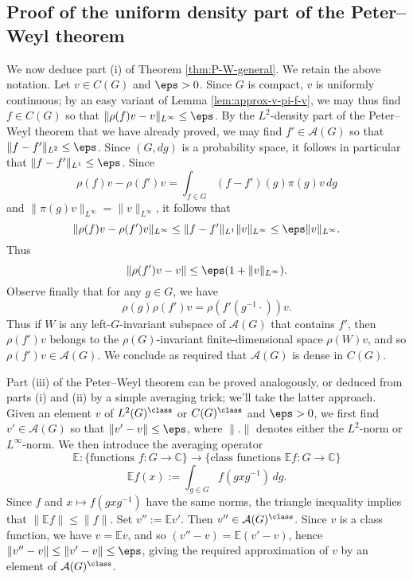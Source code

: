 \documentclass[reqno]{amsart} 
\begin{document}
\subsection{Proof of the uniform density
part of the Peter--Weyl theorem}
We now deduce part (i) of Theorem \ref{thm:P-W-general}.  We retain the above notation.  Let $v \in C(G)$ and $\eps > 0$.  Since $G$ is compact, $v$ is uniformly continuous; by an easy variant of Lemma \ref{lem:approx-v-pi-f-v}, we may thus find $f \in C(G)$ so that $\|\rho(f) v - v\|_{L^\infty} \leq \eps$.  By the $L^2$-density part of the Peter--Weyl theorem that we have already proved, we may find $f' \in \mathcal{A}(G)$ so that $\|f - f'\|_{L^2} \leq \eps$.  Since $(G, d g)$ is a probability space, it follows in particular that $\|f - f'\|_{L^1} \leq \eps$.  Since
\begin{equation*}
  \rho(f) v - \rho(f') v = \int_{f \in G} (f - f')(g) \pi(g) v \, d g
\end{equation*}
and $\|\pi(g) v\|_{L^\infty} = \|v\|_{L^\infty}$, it follows that
\begin{equation*}
  \|\rho(f) v - \rho(f') v\|_{L^\infty} \leq \|f - f'\|_{L^1} \|v\|_{L^\infty} \leq \eps \|v\|_{L^\infty}.
\end{equation*}
Thus
\begin{equation*}
  \|\rho(f') v - v \| \leq \eps (1 + \|v\|_{L^\infty}).
\end{equation*}
Observe finally that for any $g \in G$, we have
\begin{equation*}
  \rho(g) \rho (f') v = \rho(f'(g^{-1} \cdot )) v.
\end{equation*}
Thus if $W$ is any left-$G$-invariant subspace of $\mathcal{A}(G)$ that contains $f'$, then $\rho (f') v$ belongs to the $\rho(G)$-invariant finite-dimensional space $\rho(W) v$, and so $\rho (f') v \in \mathcal{A}(G)$.  We conclude as required that $\mathcal{A}(G)$ is dense in $C(G)$.

Part (iii) of the Peter--Weyl theorem can be proved analogously, or deduced from parts (i) and (ii) by a simple averaging trick; we'll take the latter approach.  Given an element $v$ of $L^2(G)^{\class}$ or $C(G)^{\class}$ and $\eps > 0$, we first find $v' \in \mathcal{A}(G)$ so that $\|v' - v\| \leq \eps$, where $\|.\|$ denotes either the $L^2$-norm or $L^\infty$-norm.  We then introduce the averaging operator
\begin{equation*}
  \mathbb{E} : \{\text{functions }f: G \rightarrow \mathbb{C}\} \rightarrow \{\text{class functions } \mathbb{E} f: G \rightarrow \mathbb{C}\}
\end{equation*}
\begin{equation*}
  \mathbb{E} f(x) := \int_{g \in G} f(g x g^{-1}) \, d g.
\end{equation*}
Since $f$ and $x \mapsto f(g x g^{-1})$ have the same norms, the triangle inequality implies that $\|\mathbb{E} f\| \leq \|f\|$.  Set $v'' := \mathbb{E} v'$.  Then $v'' \in \mathcal{A}(G)^{\class}$.  Since $v$ is a class function, we have $v = \mathbb{E} v$, and so $(v'' - v) = \mathbb{E} (v' - v)$, hence $\|v'' - v\| \leq \|v' - v\| \leq \eps$, giving the required approximation of $v$ by an element of $\mathcal{A}(G)^{\class}$.
\end{document}

